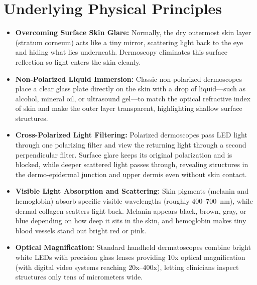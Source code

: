 \section{Underlying Physical Principles}
\begin{itemize}
\item \textbf{Overcoming Surface Skin Glare:} Normally, the dry outermost skin layer (stratum corneum) acts like a tiny mirror, scattering light back to the eye and hiding what lies underneath. Dermoscopy eliminates this surface reflection so light enters the skin cleanly.
\item \textbf{Non-Polarized Liquid Immersion:} Classic non-polarized dermoscopes place a clear glass plate directly on the skin with a drop of liquid---such as alcohol, mineral oil, or ultrasound gel---to match the optical refractive index of skin and make the outer layer transparent, highlighting shallow surface structures.
\item \textbf{Cross-Polarized Light Filtering:} Polarized dermoscopes pass LED light through one polarizing filter and view the returning light through a second perpendicular filter. Surface glare keeps its original polarization and is blocked, while deeper scattered light passes through, revealing structures in the dermo-epidermal junction and upper dermis even without skin contact.
\item \textbf{Visible Light Absorption and Scattering:} Skin pigments (melanin and hemoglobin) absorb specific visible wavelengths (roughly 400--700~nm), while dermal collagen scatters light back. Melanin appears black, brown, gray, or blue depending on how deep it sits in the skin, and hemoglobin makes tiny blood vessels stand out bright red or pink.
\item \textbf{Optical Magnification:} Standard handheld dermatoscopes combine bright white LEDs with precision glass lenses providing 10x optical magnification (with digital video systems reaching 20x--400x), letting clinicians inspect structures only tens of micrometers wide.
\end{itemize}

